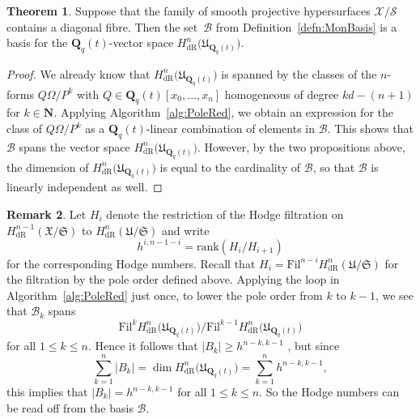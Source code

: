 \documentclass[a4paper,11pt]{article}
\numberwithin{equation}{section}
\providecommand{\card}[1]{\lvert#1\rvert}                %
\newcommand{\NN}{\mathbf{N}} %
\newcommand{\QQ}{\mathbf{Q}} %
\providecommand{\HdR}{H_{\text{dR}}}    %
\providecommand{\cB}{\mathcal{B}} %
\theoremstyle{definition}
\newtheorem{thm}{Theorem}[section]
\newtheorem{rem}[thm]{Remark}
\begin{document}
\begin{thm} \label{thm:Basis}
Suppose that the family of smooth projective hypersurfaces 
$\mathcal{X}/\mathcal{S}$ contains a diagonal fibre.  Then the 
set~$\cB$ from Definition~\ref{defn:MonBasis} is a basis for 
the $\QQ_q(t)$-vector space $\HdR^n\bigl(\mathfrak{U}_{\QQ_q(t)}\bigr)$.
\end{thm}

\begin{proof}
We already know that $\HdR^n\bigl(\mathfrak{U}_{\QQ_q(t)}\bigr)$ is 
spanned by the classes of the $n$-forms $Q \Omega / P^k$ with 
$Q \in \QQ_q(t)[x_0, \dotsc, x_n]$ homogeneous of degree 
$kd - (n+1)$ for $k \in \NN$. Applying Algorithm~\ref{alg:PoleRed}, we 
obtain an expression for the class of $Q \Omega / P^k$ as a 
$\QQ_q(t)$-linear combination of elements in $\cB$.  This shows that 
$\cB$ spans the vector space $\HdR^n\bigl(\mathfrak{U}_{\QQ_q(t)}\bigr)$. 
However, by the two propositions above, the dimension of 
$\HdR^n\bigl(\mathfrak{U}_{\QQ_q(t)}\bigr)$ is equal to the cardinality of
$\cB$, so that $\cB$ is linearly independent as well.
\end{proof}

\begin{rem} \label{rem:hnumbers}
Let $H_i$ denote the restriction of the Hodge filtration on 
$\HdR^{n-1}(\mathfrak{X}/\mathfrak{S})$ to $\HdR^{n}(\mathfrak{U}/\mathfrak{S})$
and write 
\[
h^{i,n-1-i}=\mbox{rank}(H_i/H_{i+1})
\] 
for the corresponding Hodge numbers.
Recall that $H_i=\mbox{Fil}^{n-i} \HdR^{n}(\mathfrak{U}/\mathfrak{S})$
for the filtration by the pole order defined above. Applying 
the loop in Algorithm~\ref{alg:PoleRed} just once, to lower the pole 
order from $k$ to $k-1$, we see that $\cB_k$ spans 
\[
\mbox{Fil}^{k} \HdR^{n}\bigl(\mathfrak{U}_{\QQ_q(t)}\bigr) / \mbox{Fil}^{k-1} \HdR^{n}\bigl(\mathfrak{U}_{\QQ_q(t)}\bigr)
\]
for all $1 \leq k \leq n$. Hence it follows that $\card{B_k} \geq h^{n-k,k-1}$ , but since
\[
\sum_{k=1}^n \card{B_k} = \dim \HdR^n\bigl(\mathfrak{U}_{\QQ_q(t)}\bigr) = \sum_{k=1}^n h^{n-k,k-1},
\] 
this implies that $\card{B_k} = h^{n-k,k-1}$ for all $1 \leq k \leq n$. So the Hodge numbers
can be read off from the basis $\cB$.
\end{rem}
\end{document}
